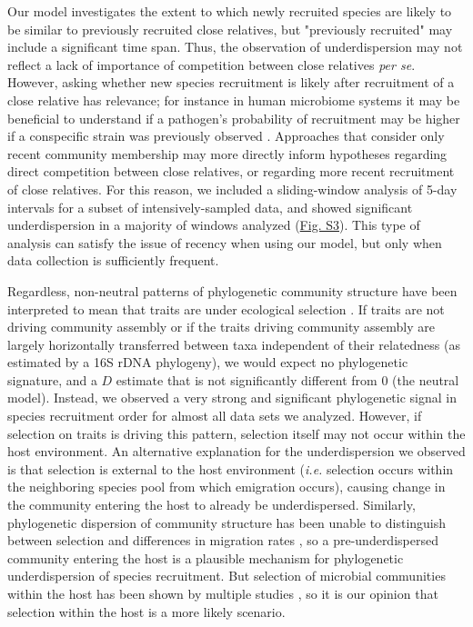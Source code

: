 \documentclass{article}
\begin{document}
Our model investigates the extent to which newly recruited species are likely to be similar to previously recruited close relatives, but "previously recruited" may include a significant time span. Thus, the observation of underdispersion may not reflect a lack of importance of competition between close relatives \emph{per se}. However, asking whether new species recruitment is likely after recruitment of a close relative has relevance; for instance in human microbiome systems it may be beneficial to understand if a pathogen's probability of recruitment may be higher if a conspecific strain was previously observed \cite{Li2016,Stecher2010}. Approaches that consider only recent community membership may more directly inform hypotheses regarding direct competition between close relatives, or regarding more recent recruitment of close relatives. For this reason, we included a sliding-window analysis of 5-day intervals for a subset of intensively-sampled data, and showed significant underdispersion in a majority of windows analyzed (\hyperref[sec:figureS3]{Fig. S3}). This type of analysis can satisfy the issue of recency when using our model, but only when data collection is sufficiently frequent.
\par
Regardless, non-neutral patterns of phylogenetic community structure have been interpreted to mean that traits are under ecological selection \cite{Webb2000,Webb2002,CavenderBares2004,Gerhold2015}. If traits are not driving community assembly \cite{Hubbell2001} or if the traits driving community assembly are largely horizontally transferred between taxa independent of their relatedness (as estimated by a 16S rDNA phylogeny), we would expect no phylogenetic signature, and a \(D\) estimate that is not significantly different from 0 (the neutral model). Instead, we observed a very strong and significant phylogenetic signal in species recruitment order for almost all data sets we analyzed. However, if selection on traits is driving this pattern, selection itself may not occur within the host environment. An alternative explanation for the underdispersion we observed is that selection is external to the host environment (\emph{i.e.} selection occurs within the neighboring species pool from which emigration occurs), causing change in the community entering the host to already be underdispersed. Similarly, phylogenetic dispersion of community structure has been unable to distinguish between selection and differences in migration rates \cite{Emerson2008}, so a pre-underdispersed community entering the host is a plausible mechanism for phylogenetic underdispersion of species recruitment. But selection of microbial communities within the host has been shown by multiple studies \cite{Peterfreund2012,David2014,Kennedy2016}, so it is our opinion that selection within the host is a more likely scenario.
\end{document}
